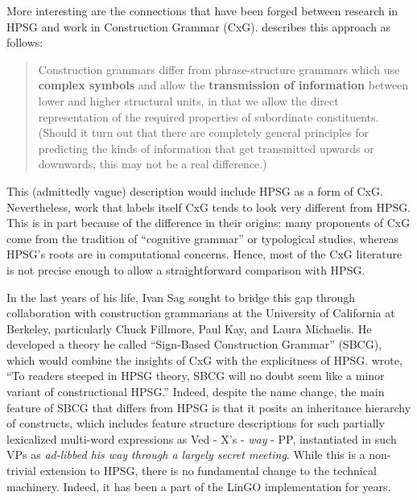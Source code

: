 \documentclass[output=paper]{langsci/langscibook}
\begin{document}
More interesting are the connections that have been forged between research in HPSG and work in Construction Grammar (CxG).  \citet{Fillmore88a} describes this approach as follows:
\begin{quote}
Construction grammars differ from phrase-structure grammars which use {\bf complex symbols} and allow the {\bf transmission of information} between lower and higher structural units, in that we allow the direct representation of the required properties of subordinate constituents.  (Should it turn out that there are completely general principles for predicting the kinds of information that get transmitted upwards or downwards, this may not be a real difference.)
\end{quote}
This (admittedly vague) description would include HPSG as a form of CxG.  Nevertheless, work that labels itself CxG tends to look very different from HPSG.  This is in part because of the difference in their origins: many proponents of CxG come from the tradition of ``cognitive grammar'' or typological
studies, whereas HPSG's roots are in computational concerns. Hence, most of the CxG literature is not precise enough to allow a straightforward comparison with HPSG.

In the last years of his life, Ivan Sag sought to bridge this gap through collaboration with construction grammarians at the University of California at Berkeley, particularly Chuck Fillmore, Paul Kay, and Laura Michaelis.  He developed a theory he called ``Sign-Based Construction Grammar'' (SBCG), which would combine the insights of CxG with the explicitness of HPSG.  \citet{Sag2012a} wrote, ``To readers steeped in HPSG theory, SBCG will no doubt seem like a minor variant of constructional HPSG.''  Indeed, despite the name change, the main feature of SBCG that differs from HPSG is that it posits an inheritance hierarchy of constructs, which includes feature structure descriptions for such partially lexicalized multi-word expressions as Ved - X's - {\it way} - PP, instantiated in such VPs as {\it ad-libbed his way through a largely
secret meeting}.  While this is a non-trivial extension to HPSG, there is no fundamental change to the technical machinery.  Indeed, it has been a part of the LinGO implementation for years. 
\end{document}
